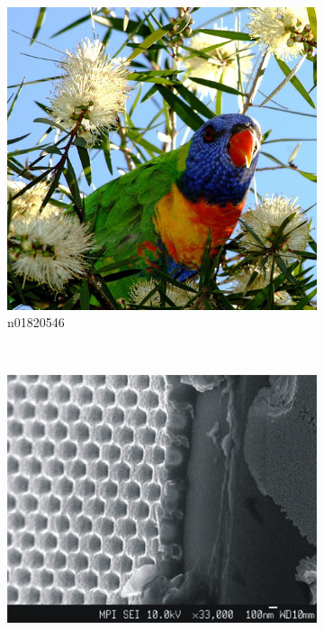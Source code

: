 \documentclass[11pt, a4paper]{article}
\begin{document}
\begin{figure}[htb]
    \centering
    \begin{subfigure}[b]{0.30\textwidth}
    		\centering
        \includegraphics[width=\textwidth]{imagenet/examples/n01820546_31.JPEG}
        \caption{n01820546}
        \label{fig:imagenet-examples-1}
    \end{subfigure}
    ~ %
    \begin{subfigure}[b]{0.30\textwidth}
    		\centering
        \includegraphics[width=\textwidth]{imagenet/examples/n03530642_10006.JPEG}

\end{subfigure}
\end{figure}
\end{document}
